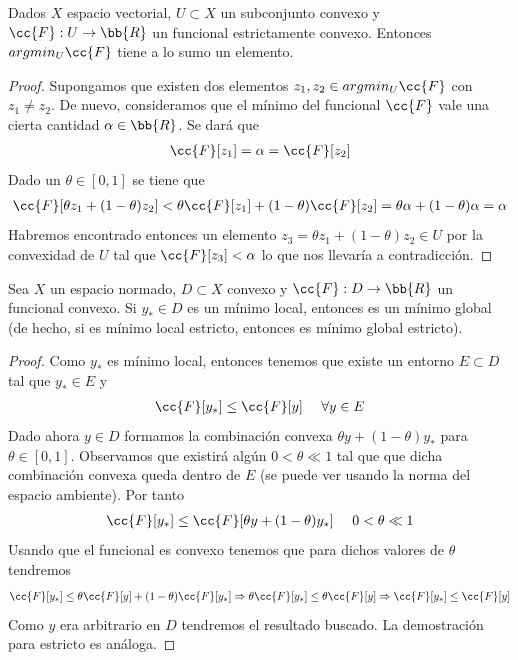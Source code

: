 \begin{coro}
    Dados $X$ espacio vectorial, $U\subset X$ un subconjunto convexo y $\cc{F}:U \to \bb{R}$ un funcional estrictamente convexo. Entonces $argmin_U \cc{F}$ tiene a lo sumo un elemento.
    \begin{proof}
        Supongamos que existen dos elementos $z_1,z_2\in argmin_U\cc{F}$ con $z_1\neq z_2$. De nuevo, consideramos que el mínimo del funcional $\cc{F}$ vale una cierta cantidad $\alpha\in \bb{R}$. Se dará que
        \begin{gather*}
            \cc{F}[z_1] = \alpha = \cc{F}[z_2]
        \end{gather*}
        Dado un $\theta \in [0,1]$ se tiene que
        \begin{gather*}
            \cc{F}[\theta z_1 + (1-\theta)z_2] < \theta \cc{F}[z_1] + (1-\theta)\cc{F}[z_2] = \theta \alpha + (1-\theta) \alpha = \alpha
        \end{gather*} 
        Habremos encontrado entonces un elemento $z_3 = \theta z_1 + (1-\theta)z_2 \in U$ por la convexidad de $U$ tal que $\cc{F}[z_3]<\alpha$ lo que nos llevaría a contradicción.
    \end{proof}
\end{coro}

\begin{prop}
    Sea $X$ un espacio normado, $D \subset X$ convexo y $\cc{F}:D \to \bb{R}$ un funcional convexo. Si $y_*\in D$ es un mínimo local, entonces es un mínimo global (de hecho, si es mínimo local estricto, entonces es mínimo global estricto).

    \begin{proof}
        Como $y_*$ es mínimo local, entonces tenemos que existe un entorno $E \subset D$ tal que $y_*\in E$ y 
        \begin{gather*}
            \cc{F}[y_*] \leq \cc{F}[y]\ \ \ \ \forall y \in E
        \end{gather*}
        Dado ahora $y\in D$ formamos la combinación convexa $\theta y + (1-\theta)y_*$ para $\theta\in[0,1]$. Observamos que existirá algún $0 < \theta \ll 1$ tal que que dicha combinación convexa queda dentro de $E$ (se puede ver usando la norma del espacio ambiente). Por tanto
        \begin{gather*}
            \cc{F}[y_*] \leq \cc{F}[\theta y + (1-\theta)y_*] \ \ \ \ 0 <\theta \ll1
        \end{gather*}
        Usando que el funcional es convexo tenemos que para dichos valores de $\theta$ tendremos
        \begin{gather*}
            \cc{F}[y_*] \leq \theta \cc{F}[y] + (1-\theta)\cc{F}[y_*] \Rightarrow \theta \cc{F}[y_*] \leq \theta \cc{F}[y] \Rightarrow \cc{F}[y_*] \leq \cc{F}[y]
        \end{gather*}
        Como $y$ era arbitrario en $D$ tendremos el resultado buscado. La demostración para estricto es análoga.
    \end{proof}
\end{prop}

